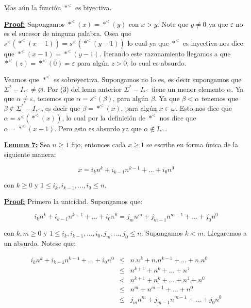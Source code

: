     \par Mas aún la función $\ast^{<}$ es biyectiva.

  \textbf{\underline{Proof:}} Supongamos $\ast^{<}(x) = \ast^{<}(y)$ con $x > y$. Note que $y \neq 0$ ya que
    $\varepsilon$ no es el sucesor de ninguna palabra. Osea que $s^{<}(\ast^{<}(x - 1)) = s^{<}(\ast^{<}(y - 1))$ lo
    cual ya que $\ast^{<}$ es inyectiva nos dice que $\ast^{<}(x - 1) = \ast^{<}(y - 1)$. Iterando este razonamiento
    llegamos a que $\ast^{<}(z) = \ast^{<}(0) = \varepsilon$ para algún $z > 0$, lo cual es absurdo.

    \par Veamos que $\ast^{<}$ es sobreyectiva. Supongamos no lo es, es decir supongamos que
    $\Sigma^{\ast}-I_{\ast^{<}} \neq \varnothing$. Por (3) del lema anterior $\Sigma^{\ast}-I_{\ast^{<}}$ tiene un
    menor elemento $\alpha$. Ya que $\alpha \neq \varepsilon$, tenemos que $\alpha = s^{<}(\beta)$, para algún $\beta$.
    Ya que $\beta < \alpha$ tenemos que $\beta \notin \Sigma^{\ast}-I_{\ast^{<}}$, es decir que $\beta = \ast^{<}(x)$,
    para algún $x \in \omega$. Esto nos dice que $\alpha = s^{<}(\ast^{<}(x))$, lo cual por la definición de
    $\ast^{<}$ nos dice que $\alpha = \ast^{<}(x + 1)$. Pero esto es absurdo ya que $\alpha \notin I_{\ast^{<}}$.

  \QED


  \textbf{\underline{Lemma 7:}} Sea $n \geq 1$ fijo, entonces cada $x \geq 1$ se escribe en forma única de la siguiente
    manera:

    \[
      x = i_{k} n^{k} + i_{k - 1} n^{k - 1} + ... + i_{0} n^{0}
    \]

    \par con $k\geq 0$ y $1\leq i_{k},i_{k-1},...,i_{0}\leq n$.

  \textbf{\underline{Proof:}} Primero la unicidad. Supongamos que:

    \[
      i_{k} n^{k} + i_{k - 1} n^{k - 1} + ... + i_{0} n^{0} = j_{m} n^{m} + j_{m - 1} n^{m - 1} + ... + j_{0} n^{0}
    \]

    \par con $k, m \geq 0$ y $1 \leq i_{k}, i_{k - 1}, ..., i_{0}, j_{m}, ..., j_{0} \leq n$. Supongamos $k < m$.
    Llegaremos a un absurdo. Notese que:

    \begin{eqnarray}
			\nonumber i_{k}n^{k}+i_{k-1}n^{k-1}+...+i_{0}n^{0} & \leq & n.n^{k}+n.n^{k-1}+...+n.n^{0} \\
			\nonumber & \leq & n^{k+1}+n^{k}+...+n^{1} \\ & < & n^{k+1}+n^{k}+...+n^{1}+n^{0} \\
			\nonumber & \leq & n^{m}+n^{m-1}+...+n^{0} \\
      \nonumber & \leq & j_{m}n^{m}+j_{m-1}n^{m-1}+...+j_{0}n^{0}
		\end{eqnarray}

